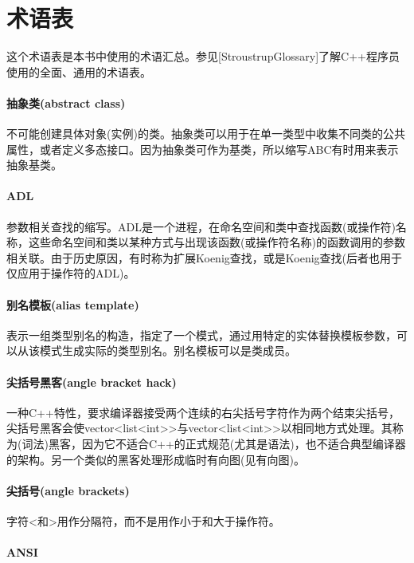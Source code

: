 \chapter*{术语表}

这个术语表是本书中使用的术语汇总。参见[StroustrupGlossary]了解C++程序员使用的全面、通用的术语表。

\subsubsection{抽象类(abstract class)}

不可能创建具体对象(实例)的类。抽象类可以用于在单一类型中收集不同类的公共属性，或者定义多态接口。因为抽象类可作为基类，所以缩写ABC有时用来表示抽象基类。

\subsubsection{ADL}

参数相关查找的缩写。ADL是一个进程，在命名空间和类中查找函数(或操作符)名称，这些命名空间和类以某种方式与出现该函数(或操作符名称)的函数调用的参数相关联。由于历史原因，有时称为扩展Koenig查找，或是Koenig查找(后者也用于仅应用于操作符的ADL)。

\subsubsection{别名模板(alias template)}  

表示一组类型别名的构造，指定了一个模式，通过用特定的实体替换模板参数，可以从该模式生成实际的类型别名。别名模板可以是类成员。

\subsubsection{尖括号黑客(angle bracket hack)}

一种C++特性，要求编译器接受两个连续的右尖括号字符作为两个结束尖括号，尖括号黑客会使vector<list<int>{}>与vector<list<int>{}>以相同地方式处理。其称为(词法)黑客，因为它不适合C++的正式规范(尤其是语法)，也不适合典型编译器的架构。另一个类似的黑客处理形成临时有向图(见有向图)。

\subsubsection{尖括号(angle brackets)}

字符<和>用作分隔符，而不是用作小于和大于操作符。

\subsubsection{ANSI}

